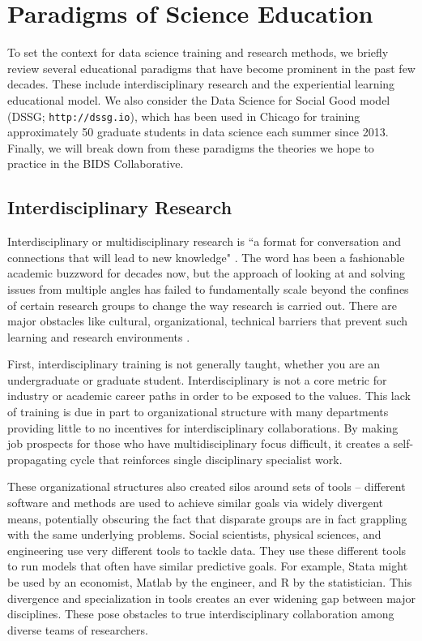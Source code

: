 \documentclass[12pt]{article}
\begin{document}
\section{Paradigms of Science Education}

To set the context for data science training and research methods, we briefly review several educational paradigms that have become prominent in the past few decades. These include interdisciplinary research and the experiential learning educational model. We also consider the Data Science for Social Good model (DSSG; \texttt{http://dssg.io}), which has been used in Chicago for training approximately 50 graduate students in data science each summer since 2013. Finally, we will break down from these paradigms the theories we hope to practice in the BIDS Collaborative.

\subsection{Interdisciplinary Research}

Interdisciplinary or multidisciplinary research is ``a format for conversation and connections that will lead to new knowledge" \citep{repko2008interdisciplinary}. The word has been a fashionable academic buzzword for decades now, but the approach of looking at and solving issues from multiple angles has failed to fundamentally scale beyond the confines of certain research groups to change the way research is carried out. There are major obstacles like cultural, organizational, technical barriers that prevent such learning and research environments \citep{eisenberg2000bridging}.

First, interdisciplinary training is not generally taught, whether you are an undergraduate or graduate student. Interdisciplinary is not a core metric for industry or academic career paths in order to be exposed to the values. This lack of training is due in part to organizational structure with many departments providing little to no incentives for interdisciplinary collaborations. By making job prospects for those who have multidisciplinary focus difficult, it creates a self-propagating cycle that reinforces single disciplinary specialist work. 

These organizational structures also created silos around sets of tools -- different software and methods are used to achieve similar goals via widely divergent means, potentially obscuring the fact that disparate groups are in fact grappling with the same underlying problems. Social scientists, physical sciences, and engineering use very different tools to tackle data. They use these different tools to run models that often have similar predictive goals. For example, Stata \citep{stata2005stata} might be used by an economist, Matlab \citep{incorporation2005matlab} by the engineer, and R \citep{RCoreTeam2014} by the statistician. This divergence and specialization in tools creates an ever widening gap between major disciplines.  These pose obstacles to true interdisciplinary collaboration among diverse teams of researchers.
\end{document}
